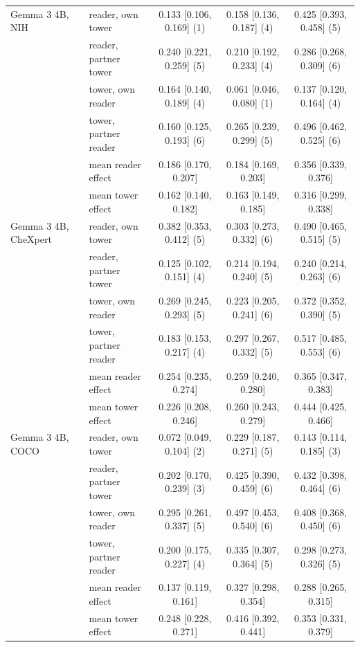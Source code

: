 \documentclass{article}
\begin{document}
\begin{table}[htbp]
\begin{tabular}{llccc}
\midrule
Gemma 3 4B, NIH & reader, own tower & 0.133 [0.106, 0.169] (1) & 0.158 [0.136, 0.187] (4) & 0.425 [0.393, 0.458] (5) \\
 & reader, partner tower & 0.240 [0.221, 0.259] (5) & 0.210 [0.192, 0.233] (4) & 0.286 [0.268, 0.309] (6) \\
 & tower, own reader & 0.164 [0.140, 0.189] (4) & 0.061 [0.046, 0.080] (1) & 0.137 [0.120, 0.164] (4) \\
 & tower, partner reader & 0.160 [0.125, 0.193] (6) & 0.265 [0.239, 0.299] (5) & 0.496 [0.462, 0.525] (6) \\
 & \quad mean reader effect & 0.186 [0.170, 0.207] & 0.184 [0.169, 0.203] & 0.356 [0.339, 0.376] \\
 & \quad mean tower effect & 0.162 [0.140, 0.182] & 0.163 [0.149, 0.185] & 0.316 [0.299, 0.338] \\
\addlinespace
Gemma 3 4B, CheXpert & reader, own tower & 0.382 [0.353, 0.412] (5) & 0.303 [0.273, 0.332] (6) & 0.490 [0.465, 0.515] (5) \\
 & reader, partner tower & 0.125 [0.102, 0.151] (4) & 0.214 [0.194, 0.240] (5) & 0.240 [0.214, 0.263] (6) \\
 & tower, own reader & 0.269 [0.245, 0.293] (5) & 0.223 [0.205, 0.241] (6) & 0.372 [0.352, 0.390] (5) \\
 & tower, partner reader & 0.183 [0.153, 0.217] (4) & 0.297 [0.267, 0.332] (5) & 0.517 [0.485, 0.553] (6) \\
 & \quad mean reader effect & 0.254 [0.235, 0.274] & 0.259 [0.240, 0.280] & 0.365 [0.347, 0.383] \\
 & \quad mean tower effect & 0.226 [0.208, 0.246] & 0.260 [0.243, 0.279] & 0.444 [0.425, 0.466] \\
\addlinespace
Gemma 3 4B, COCO & reader, own tower & 0.072 [0.049, 0.104] (2) & 0.229 [0.187, 0.271] (5) & 0.143 [0.114, 0.185] (3) \\
 & reader, partner tower & 0.202 [0.170, 0.239] (3) & 0.425 [0.390, 0.459] (6) & 0.432 [0.398, 0.464] (6) \\
 & tower, own reader & 0.295 [0.261, 0.337] (5) & 0.497 [0.453, 0.540] (6) & 0.408 [0.368, 0.450] (6) \\
 & tower, partner reader & 0.200 [0.175, 0.227] (4) & 0.335 [0.307, 0.364] (5) & 0.298 [0.273, 0.326] (5) \\
 & \quad mean reader effect & 0.137 [0.119, 0.161] & 0.327 [0.298, 0.354] & 0.288 [0.265, 0.315] \\
 & \quad mean tower effect & 0.248 [0.228, 0.271] & 0.416 [0.392, 0.441] & 0.353 [0.331, 0.379] \\

\end{tabular}
\end{table}
\end{document}
